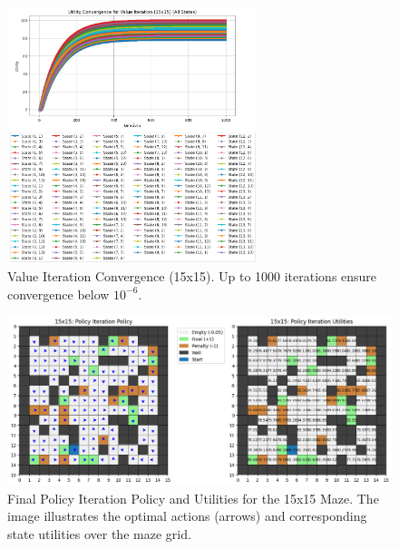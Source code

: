 \documentclass[11pt]{article}
\begin{document}
\begin{figure}[H]
    \centering
    \includegraphics[width=0.65\textwidth]{15x15_value_iteration_convergence.png}
    \caption{Value Iteration Convergence (15x15). Up to 1000 iterations ensure convergence below $10^{-6}$.}
    \label{fig:15x15_vi_conv}
\end{figure}

\begin{figure}[H]
    \centering
    \includegraphics[width=\textwidth]{15x15_policy_iteration.png}
    \caption{Final Policy Iteration Policy and Utilities for the 15x15 Maze. The image illustrates the optimal actions (arrows) and corresponding state utilities over the maze grid.}
    \label{fig:15x15_pi_side_by_side}
\end{figure}
\end{document}
